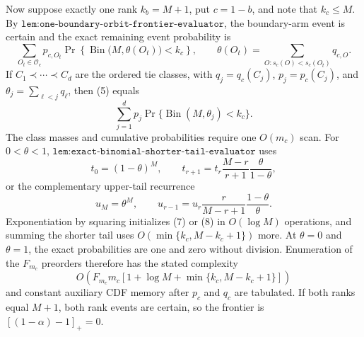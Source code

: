 Now suppose exactly one rank \(k_b=M+1\), put \(c=1-b\), and note that \(k_c\le M\). By \(\texttt{lem:one-boundary-orbit-frontier-evaluator}\), the boundary-arm event is certain and the exact remaining event probability is
\[
\sum_{O_t\in\mathcal O_c}p_{c,O_t}\Pr\!\left\{\operatorname{Bin}\bigl(M,\theta(O_t)\bigr)<k_c\right\},\qquad
\theta(O_t)=\sum_{O:s_c(O)<s_c(O_t)}q_{c,O}.
\tag{5}
\]
If \(C_1\prec\cdots\prec C_d\) are the ordered tie classes, with \(q_j=q_c(C_j)\), \(p_j=p_c(C_j)\), and \(\theta_j=\sum_{\ell<j}q_\ell\), then (5) equals
\[
\sum_{j=1}^d p_j\Pr\{\operatorname{Bin}(M,\theta_j)<k_c\}.
\tag{6}
\]
The class masses and cumulative probabilities require one \(O(m_c)\) scan. For \(0<\theta<1\), \(\texttt{lem:exact-binomial-shorter-tail-evaluator}\) uses
\[
t_0=(1-\theta)^M,\qquad t_{r+1}=t_r\frac{M-r}{r+1}\frac{\theta}{1-\theta},
\tag{7}
\]
or the complementary upper-tail recurrence
\[
u_M=\theta^M,\qquad u_{r-1}=u_r\frac{r}{M-r+1}\frac{1-\theta}{\theta}.
\tag{8}
\]
Exponentiation by squaring initializes (7) or (8) in \(O(\log M)\) operations, and summing the shorter tail uses \(O(\min\{k_c,M-k_c+1\})\) more. At \(\theta=0\) and \(\theta=1\), the exact probabilities are one and zero without division. Enumeration of the \(F_{m_c}\) preorders therefore has the stated complexity
\[
O\!\left(F_{m_c}m_c\left[1+\log M+\min\{k_c,M-k_c+1\}\right]\right)
\tag{9}
\]
and constant auxiliary CDF memory after \(p_c\) and \(q_c\) are tabulated. If both ranks equal \(M+1\), both rank events are certain, so the frontier is \([(1-\alpha)-1]_+=0\).

